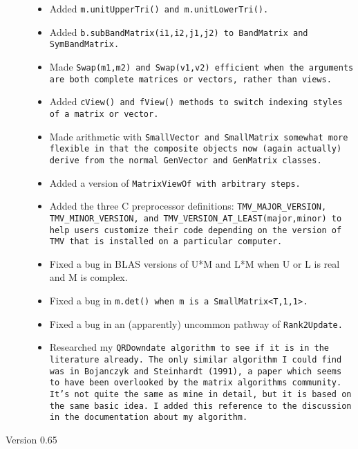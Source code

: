 \begin{description}
\begin{itemize}
\item 
Added \tt{m.unitUpperTri()} and \tt{m.unitLowerTri()}.

\item 
Added \tt{b.subBandMatrix(i1,i2,j1,j2)} to \tt{BandMatrix} and \tt{SymBandMatrix}.

\item 
Made \tt{Swap(m1,m2)} and \tt{Swap(v1,v2)} efficient when the arguments are both
complete matrices or vectors, rather than views.

\item 
Added \tt{cView()} and \tt{fView()} methods to switch indexing styles of a matrix or vector.

\item 
Made arithmetic with \tt{SmallVector} and \tt{SmallMatrix} somewhat more flexible in that
the composite objects now (again actually) derive from the normal \tt{GenVector} and
\tt{GenMatrix} classes.  

\item 
Added a version of \tt{MatrixViewOf} with arbitrary steps.

\item 
Added the three C preprocessor definitions: \tt{TMV\_MAJOR\_VERSION}, 
\tt{TMV\_MINOR\_VERSION},
and \tt{TMV\_VERSION\_AT\_LEAST(major,minor)} to help users customize
their code depending on the version of TMV that is installed on a particular
computer.  

\item 
Fixed a bug in BLAS versions of U*M and L*M when U or L is real and
M is complex.

\item 
Fixed a bug in \tt{m.det()} when \tt{m} is a \tt{SmallMatrix<T,1,1>}.

\item 
Fixed a bug in an (apparently) uncommon pathway of \tt{Rank2Update}.

\item 
Researched my \tt{QRDowndate} algorithm to see if it is in the literature already.
The only similar algorithm I could find was in Bojanczyk and Steinhardt (1991), 
a paper which seems to have been overlooked by the matrix algorithms community.
It's not quite the same as mine in detail, but it is based on the same basic idea.
I added this reference to the discussion in the documentation about my algorithm.

\end{itemize}

\item[Version 0.65]


\end{description}
